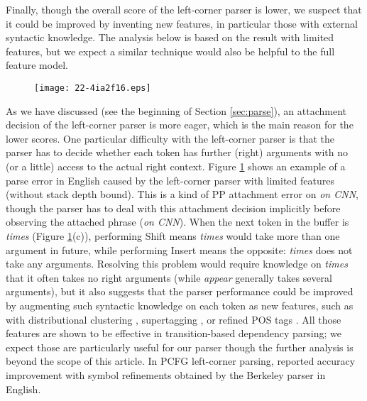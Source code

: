 \documentclass[english]{jnlp_1.4}
\begin{document}
Finally, though the overall score of the left-corner parser is lower,
we suspect that it could be improved by inventing new features, in particular those with external syntactic knowledge.
The analysis below is based on the result with limited features, but we expect a similar technique would also be helpful to the full feature model.

\begin{figure}[t]
\begin{center}
\texttt{[image: 22-4ia2f16.eps]}
\end{center}
 \label{fig:error:example}
\end{figure}

As we have discussed (see the beginning of Section \ref{sec:parse}), an attachment decision of the left-corner parser is more eager, which is the main reason for the lower scores.
One particular difficulty with the left-corner parser is that the parser has to decide whether each token has further (right) arguments with no (or a little) access to the actual right context.
Figure \ref{fig:error:example} shows an example of a parse error in English caused by the left-corner parser with limited features (without stack depth bound).
This is a kind of PP attachment error on {\it on CNN}, though the parser has to deal with this attachment decision implicitly before observing the attached phrase ({\it on CNN}).
When the next token in the buffer is {\it times} (Figure \ref{fig:error:example}(c)), performing {\sc Shift} means {\it times} would take more than one argument in future, while performing {\sc Insert} means the opposite:
{\it times} does not take any arguments.
Resolving this problem would require knowledge on {\it times} that it often takes no right arguments (while {\it appear} generally takes several arguments), but it also suggests that the parser performance could be improved by augmenting such syntactic knowledge on each token as new features, such as with distributional clustering \cite{koo-carreras-collins:2008:ACLMain,BohnetJMA13}, supertagging \cite{ouchi-duh-matsumoto:2014:EACL2014-SP}, or refined POS tags \cite{mueller-EtAl:2014:EMNLP2014}.
All those features are shown to be effective in transition-based dependency parsing;
we expect those are particularly useful for our parser though the further analysis is beyond the scope of this article.
In PCFG left-corner parsing,  reported accuracy improvement with symbol refinements obtained by the Berkeley parser \cite{petrov-EtAl:2006:COLACL} in English.
\end{document}

